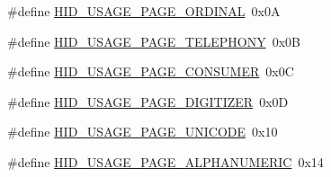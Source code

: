\begin{DoxyCompactItemize}
\item 
\#define \hyperlink{group__USBD__HID_ga3a95742428e1df3ffb0e6ce94d4b5f70}{H\+I\+D\+\_\+\+U\+S\+A\+G\+E\+\_\+\+P\+A\+G\+E\+\_\+\+O\+R\+D\+I\+N\+AL}~0x0A
\item 
\#define \hyperlink{group__USBD__HID_ga1e9dbe0dd0699f313276f9f0d6a82bbb}{H\+I\+D\+\_\+\+U\+S\+A\+G\+E\+\_\+\+P\+A\+G\+E\+\_\+\+T\+E\+L\+E\+P\+H\+O\+NY}~0x0B
\item 
\#define \hyperlink{group__USBD__HID_gab0073496a706dcf681841328f14e53c3}{H\+I\+D\+\_\+\+U\+S\+A\+G\+E\+\_\+\+P\+A\+G\+E\+\_\+\+C\+O\+N\+S\+U\+M\+ER}~0x0C
\item 
\#define \hyperlink{group__USBD__HID_gaf5dd509fe6bf4e8f400720e46cc93639}{H\+I\+D\+\_\+\+U\+S\+A\+G\+E\+\_\+\+P\+A\+G\+E\+\_\+\+D\+I\+G\+I\+T\+I\+Z\+ER}~0x0D
\item 
\#define \hyperlink{group__USBD__HID_gac7b3e712eaff97931f7d5fc36468ec0d}{H\+I\+D\+\_\+\+U\+S\+A\+G\+E\+\_\+\+P\+A\+G\+E\+\_\+\+U\+N\+I\+C\+O\+DE}~0x10
\item 
\#define \hyperlink{group__USBD__HID_gabbec7fd25201bab7caa5abaed67f9152}{H\+I\+D\+\_\+\+U\+S\+A\+G\+E\+\_\+\+P\+A\+G\+E\+\_\+\+A\+L\+P\+H\+A\+N\+U\+M\+E\+R\+IC}~0x14
\end{DoxyCompactItemize}
